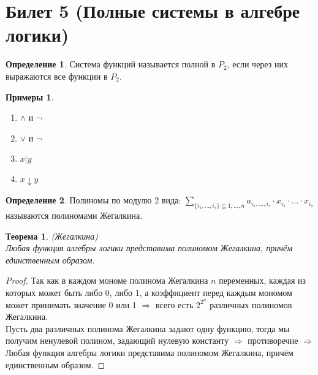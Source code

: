 \documentclass[a4paper, 12pt]{article}
\theoremstyle{definition}
\newtheorem*{definition}{Определение}
\newtheorem*{example}{Примеры}
\theoremstyle{plain}
\newtheorem*{theorem}{Теорема}
\theoremstyle{remark}
\begin{document}
  \section{Билет 5 (Полные системы в алгебре логики)}
  \begin{definition}
    Система функций называется полной в $P_2$, если через них выражаются все функции в $P_2$.
  \end{definition}
  \begin{example}
    \begin{enumerate}
      \item $\wedge$ и $\neg$
      \item $\vee$ и $\neg$
      \item $x|y$
      \item $x\downarrow y$
    \end{enumerate}
  \end{example}
  \begin{definition}
    Полиномы по модулю 2 вида: $\sum\limits_{\{i_1,\dots,i_s\}\subseteq{1,\ldots,n}}a_{i_1,\ldots,i_s}\cdot x_{i_1}\cdot\ldots\cdot x_{i_s}$ называются полиномами Жегалкина.
  \end{definition}
  \begin{theorem}(Жегалкина)\\
    Любая функция алгебры логики представима полиномом Жегалкина, причём единственным образом.
  \end{theorem}
  \begin{proof}
    Так как в каждом мономе полинома Жегалкина $n$ переменных, каждая из которых может быть либо 0, либо 1, а коэффициент перед каждым мономом может принимать значение 0 или 1 $\Longrightarrow$ всего есть $2^{2^n}$ различных полиномов Жегалкина.\\
    Пусть два различных полинома Жегалкина задают одну функцию, тогда мы получим ненулевой полином, задающий нулевую константу $\Longrightarrow$ противоречие $\Longrightarrow$  Любая функция алгебры логики представима полиномом Жегалкина, причём единственным образом.
  \end{proof}
\end{document}
